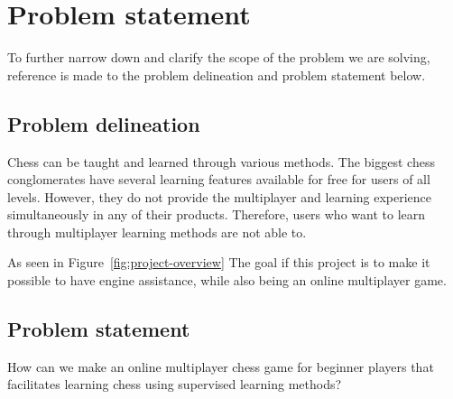 \chapter{Problem statement}\label{ch:problem-statement}

To further narrow down and clarify the scope of the problem we are solving, reference is made to the problem delineation
and problem statement below.

\section{Problem delineation}\label{sec:problem-delineation}

Chess can be taught and learned through various methods.
The biggest chess conglomerates have several learning features available for free for users of all levels.
However, they do not provide the multiplayer and learning experience simultaneously in any of their products.
Therefore, users who want to learn through multiplayer learning methods are not able to.

As seen in Figure~\ref{fig:project-overview} The goal if this project is to make it possible to have engine
assistance, while also being an online multiplayer game.

\section{Problem statement}\label{sec:problem-statement}

How can we make an online multiplayer chess game for beginner players that facilitates learning chess using supervised
learning methods?
